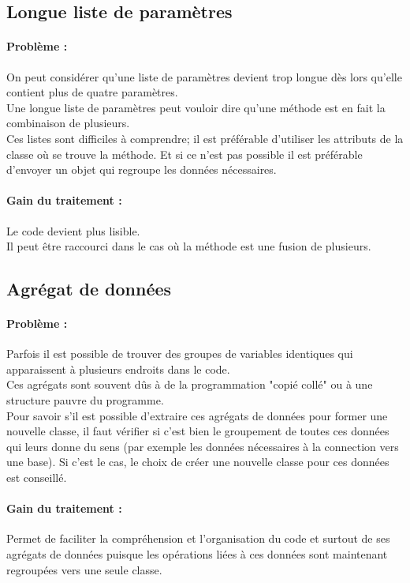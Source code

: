 \documentclass[a4paper,twoside,12pt,openright]{report}
\begin{document}
\subsection{Longue liste de paramètres}
\paragraph{Problème :}
On peut considérer qu'une liste de paramètres devient trop longue dès lors qu'elle contient plus de quatre paramètres.\\
Une longue liste de paramètres peut vouloir dire qu'une méthode est en fait la combinaison de plusieurs.\\
Ces listes sont difficiles à comprendre; il est préférable d'utiliser les attributs de la classe où se trouve la méthode. Et si ce n'est pas possible il est préférable d'envoyer un objet qui regroupe les données nécessaires.\\

\paragraph{Gain du traitement :}
Le code devient plus lisible.\\
Il peut être raccourci dans le cas où la méthode est une fusion de plusieurs.\\

\subsection{Agrégat de données}
\paragraph{Problème :}
Parfois il est possible de trouver des groupes de variables identiques qui apparaissent à plusieurs endroits dans le code.\\
Ces agrégats sont souvent dûs à de la programmation "copié collé" ou à une structure pauvre du programme.\\
Pour savoir s'il est possible d'extraire ces agrégats de données pour former une nouvelle classe, il faut vérifier si c'est bien le groupement de toutes ces données qui leurs donne du sens (par exemple les données nécessaires à la connection vers une base). Si c'est le cas, le choix de créer une nouvelle classe pour ces données est conseillé.\\

\paragraph{Gain du traitement :}
Permet de faciliter la compréhension et l'organisation du code et surtout de ses agrégats de données puisque les opérations liées à ces données sont maintenant regroupées vers une seule classe.\\
\end{document}
